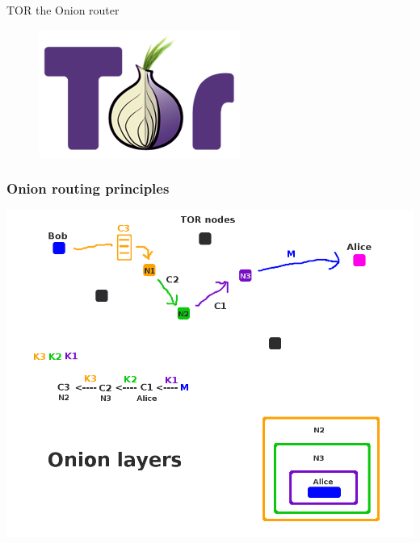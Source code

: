 \begin{frame}
\begin{center}
\Huge{TOR the Onion router}
\end{center}
\begin{figure}
\includegraphics[width=0.5\linewidth]{./materials/tor.png}
\end{figure}
\end{frame}

\begin{frame}
\begin{center}
\frametitle{Onion routing principles}
\includegraphics[width=0.8\linewidth]{./materials/Tor_principles_Naam}
\end{center}
\end{frame}

